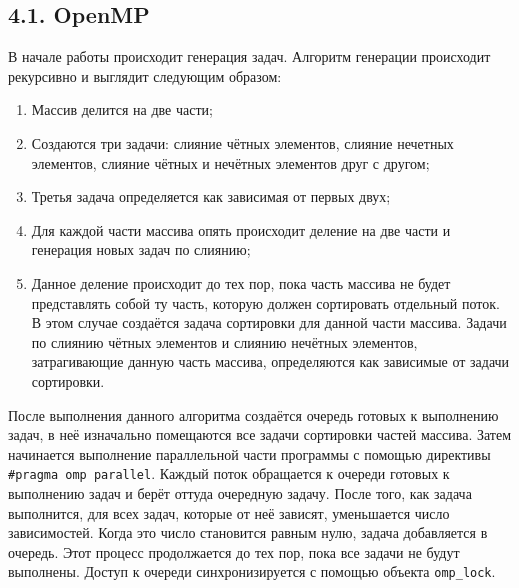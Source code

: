 \documentclass{report}
\begin{document}
    \subsection*{4.1. OpenMP}
    \par В начале работы происходит генерация задач. Алгоритм генерации происходит рекурсивно и выглядит следующим образом: 
    \begin{enumerate}
        \item Массив делится на две части;
        \item Создаются три задачи: слияние чётных элементов, слияние нечетных элементов, слияние чётных и нечётных элементов друг с другом;
        \item Третья задача определяется как зависимая от первых двух;
        \item Для каждой части массива опять происходит деление на две части и генерация новых задач по слиянию;
        \item Данное деление происходит до тех пор, пока часть массива не будет представлять собой ту часть, которую должен сортировать отдельный поток. В этом случае создаётся задача сортировки для данной части массива. Задачи по слиянию чётных элементов и слиянию нечётных элементов, затрагивающие данную часть массива, определяются как зависимые от задачи сортировки.
    \end{enumerate}
    \par После выполнения данного алгоритма создаётся очередь готовых к выполнению задач, в неё изначально помещаются все задачи сортировки частей массива. Затем начинается выполнение параллельной части программы с помощью директивы \verb|#pragma omp parallel|. Каждый поток обращается к очереди готовых к выполнению задач и берёт оттуда очередную задачу. После того, как задача выполнится, для всех задач, которые от неё зависят, уменьшается число зависимостей. Когда это число становится равным нулю, задача добавляется в очередь. Этот процесс продолжается до тех пор, пока все задачи не будут выполнены. Доступ к очереди синхронизируется с помощью объекта \verb|omp_lock|.
    
\end{document}
